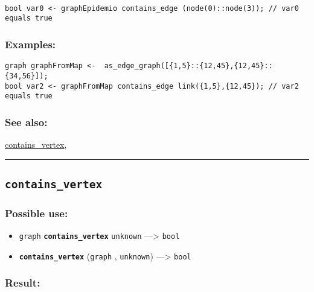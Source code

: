 \documentclass[]{book}
\providecommand{\tightlist}{%
  \setlength{\itemsep}{0pt}\setlength{\parskip}{0pt}}
\theoremstyle{definition}
\theoremstyle{definition}
\theoremstyle{definition}
\theoremstyle{remark}
\begin{document}
\begin{verbatim}
 
bool var0 <- graphEpidemio contains_edge (node(0)::node(3)); // var0 equals true
\end{verbatim}

\subsubsection{Examples:}\label{examples-79}

\begin{verbatim}
graph graphFromMap <-  as_edge_graph([{1,5}::{12,45},{12,45}::{34,56}]);  
bool var2 <- graphFromMap contains_edge link({1,5},{12,45}); // var2 equals true
\end{verbatim}

\subsubsection{See also:}\label{see-also-65}

\href{OperatorsBC\#contains_vertex}{contains\_vertex},

\begin{center}\rule{0.5\linewidth}{\linethickness}\end{center}

\subsection{\texorpdfstring{\texttt{contains\_vertex}}{contains\_vertex}}\label{contains_vertex}

\subsubsection{Possible use:}\label{possible-use-103}

\begin{itemize}
\tightlist
\item
  \texttt{graph} \textbf{\texttt{contains\_vertex}} \texttt{unknown}
  ---\textgreater{} \texttt{bool}
\item
  \textbf{\texttt{contains\_vertex}} (\texttt{graph} , \texttt{unknown})
  ---\textgreater{} \texttt{bool}
\end{itemize}

\subsubsection{Result:}\label{result-101}
\end{document}
